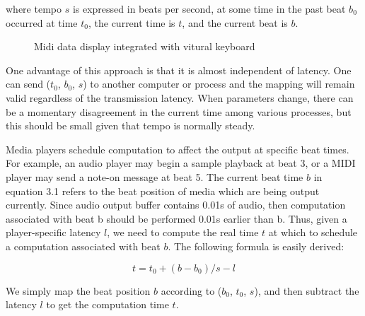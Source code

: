 where tempo $s$ is expressed in beats per second, at some time in the past beat $b_0$
occurred at time $t_0$, the current time is $t$, and the current beat is $b$.

\begin{figure}[H]
\caption{Midi data display integrated with vitural keyboard}
\label{fig:speciation}
\end{figure}

One advantage of this approach is that it is almost independent of latency.
One can send ($t_0$, $b_0$, $s$) to another computer or process and the mapping will remain
valid regardless of the transmission latency. When parameters change,
there can be a momentary disagreement in the current time among various
processes, but this should be small given that tempo is normally steady.

Media players schedule computation to affect the output at specific beat
times. For example, an audio player may begin a sample playback at beat 3, or a
MIDI player may send a note-on message at beat 5. The current beat time $b$ in 
equation 3.1
refers to the beat position of media which are being output currently.
Since audio output buffer contains 0.01s of audio, then computation associated with
beat b should be performed 0.01s earlier than b. Thus, given a player-specific latency
$l$, we need to compute the real time $t$ at which to schedule a computation associated
with beat $b$. The following formula is easily derived:

\begin{equation}
t = t_0 + (b - b_0) / s - l
\end{equation}

We simply map the beat position $b$ according to ($b_0$, $t_0$, $s$), and then subtract the
latency $l$ to get the computation time $t$.

